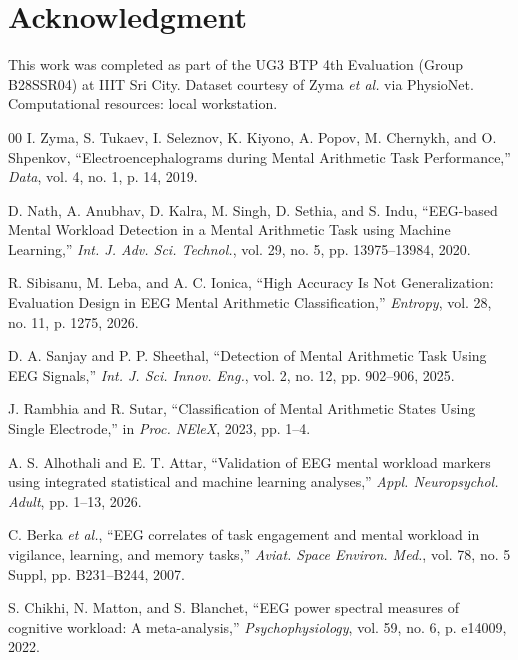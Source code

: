 \documentclass[conference]{IEEEtran}
\begin{document}
\section*{Acknowledgment}
This work was completed as part of the UG3 BTP 4th Evaluation (Group B28SSR04) at IIIT Sri City. Dataset courtesy of Zyma \textit{et al.} via PhysioNet. Computational resources: local workstation.




\begin{thebibliography}{00}
I. Zyma, S. Tukaev, I. Seleznov, K. Kiyono, A. Popov, M. Chernykh, and O. Shpenkov, ``Electroencephalograms during Mental Arithmetic Task Performance,'' \textit{Data}, vol. 4, no. 1, p. 14, 2019.

D. Nath, A. Anubhav, D. Kalra, M. Singh, D. Sethia, and S. Indu, ``EEG-based Mental Workload Detection in a Mental Arithmetic Task using Machine Learning,'' \textit{Int. J. Adv. Sci. Technol.}, vol. 29, no. 5, pp. 13975--13984, 2020.

R. Sibisanu, M. Leba, and A. C. Ionica, ``High Accuracy Is Not Generalization: Evaluation Design in EEG Mental Arithmetic Classification,'' \textit{Entropy}, vol. 28, no. 11, p. 1275, 2026.

D. A. Sanjay and P. P. Sheethal, ``Detection of Mental Arithmetic Task Using EEG Signals,'' \textit{Int. J. Sci. Innov. Eng.}, vol. 2, no. 12, pp. 902--906, 2025.

J. Rambhia and R. Sutar, ``Classification of Mental Arithmetic States Using Single Electrode,'' in \textit{Proc. NEleX}, 2023, pp. 1--4.

A. S. Alhothali and E. T. Attar, ``Validation of EEG mental workload markers using integrated statistical and machine learning analyses,'' \textit{Appl. Neuropsychol. Adult}, pp. 1--13, 2026.

C. Berka \textit{et al.}, ``EEG correlates of task engagement and mental workload in vigilance, learning, and memory tasks,'' \textit{Aviat. Space Environ. Med.}, vol. 78, no. 5 Suppl, pp. B231--B244, 2007.

S. Chikhi, N. Matton, and S. Blanchet, ``EEG power spectral measures of cognitive workload: A meta-analysis,'' \textit{Psychophysiology}, vol. 59, no. 6, p. e14009, 2022.


\end{thebibliography}
\end{document}

